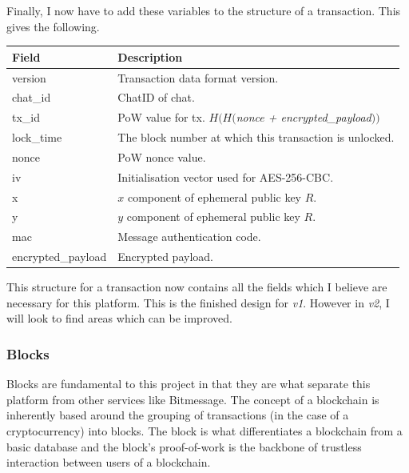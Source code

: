 \documentclass{article}
\begin{document}
Finally, I now have to add these variables to the structure of a transaction. This gives the following.
\begin{table}[H]
\centering
\begin{tabular}{|p{3cm}|p{8.5cm}|}
\hline
\rowcolor{tblgrey}
Field       & Description\\ \hline
version     & Transaction data format version.                          \\ \hline
chat\_id    & ChatID of chat. \\ \hline
tx\_id      & PoW value for tx. $H(H($\textit{nonce + encrypted\_payload}$))$ \\ \hline
lock\_time  & The block number at which this transaction is unlocked. \\ \hline
nonce       & PoW nonce value. \\ \hline
iv          & Initialisation vector used for AES-256-CBC.   \\ \hline
x           & $x$ component of ephemeral public key $R$.    \\ \hline
y           & $y$ component of ephemeral public key $R$.    \\ \hline
mac         & Message authentication code.                  \\ \hline
encrypted\_payload & Encrypted payload. \\ \hline
\end{tabular}
\end{table}

This structure for a transaction now contains all the fields which I believe are necessary for this platform. This is the finished design for \textit{v1}. However in \textit{v2}, I will look to find areas which can be improved.

\subsubsection{Blocks}
Blocks are fundamental to this project in that they are what separate this platform from other services like Bitmessage. The concept of a blockchain is inherently based around the grouping of transactions (in the case of a cryptocurrency) into blocks. The block is what differentiates a blockchain from a basic database and the block's proof-of-work is the backbone of trustless interaction between users of a blockchain.
\end{document}
